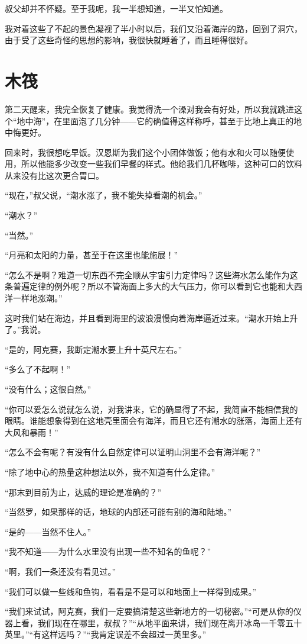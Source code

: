 \documentclass[10pt]{book}
\begin{document}
叔父却并不怀疑。至于我呢，我一半想知道，一半又怕知道。

我对着这些了不起的景色凝视了半小时以后，我们又沿着海岸的路，回到了洞穴，由于受了这些奇怪的思想的影响，我很快就睡着了，而且睡得很好。
\chapter{木筏}
第二天醒来，我完全恢复了健康。我觉得洗一个澡对我会有好处，所以我就跳进这个“地中海”，在里面泡了几分钟——它的确值得这样称呼，甚至于比地上真正的地中悔更好。

回来时，我很想吃早饭。汉恩斯为我们这个小团体做饭；他有水和火可以随便使用，所以他能多少改变一些我们早餐的样式。他给我们几杯咖啡，这种可口的饮料从来没有比这次更合胃口。

“现在，”叔父说，“潮水涨了，我不能失掉看潮的机会。”

“潮水？”

“当然。”

“月亮和太阳的力量，甚至于在这里也能施展！”

“怎么不是啊？难道一切东西不完全顺从宇宙引力定律吗？这些海水怎么能作为这条普遍定律的例外呢？所以不管海面上多大的大气压力，你可以看到它也能和大西洋一样地涨潮。”

这时我们站在海边，并且看到海里的波浪漫慢向着海岸逼近过来。“潮水开始上升了。”我说。

“是的，阿克赛，我断定潮水要上升十英尺左右。”

“多么了不起啊！”

“没有什么；这很自然。”

“你可以爱怎么说就怎么说，对我讲来，它的确显得了不起，我简直不能相信我的眼睛。谁能想象得到在这地壳里面会有海洋，而且它还有潮水的涨落，海面上还有大风和暴雨！”

“怎么不会有呢？有没有什么自然定律可以证明山洞里不会有海洋呢？”

“除了地中心的热量这种想法以外，我不知道有什么定律。”

“那末到目前为止，达威的理论是准确的？”

“当然罗，如果那样的话，地球的内部还可能有别的海和陆地。”

“是的——当然不住人。”

“我不知道——为什么水里没有出现一些不知名的鱼呢？”

“啊，我们一条还没有看见过。”

“我们可以做一些线和鱼钩，看看是不是可以和地面上一样得到成果。”

“我们来试试，阿克赛，我们一定要搞清楚这些新地方的一切秘密。”“可是从你的仪器上看，我们现在在哪里，叔叔？”“从地平面来讲，我们现在离开冰岛一千零五十英里。”“有这样远吗？”“我肯定误差不会超过一英里多。”
\end{document}

